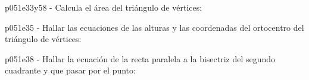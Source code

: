 \documentclass[spanish, 11pt]{exam}
\begin{document}
\begin{questions}
\begin{multicols}{1}
\begin{parts}
        \end{parts}
        \end{multicols}
        \question p051e33y58 - Calcula el área del triángulo de vértices:
        \begin{multicols}{1} 
        \end{multicols}
        \question p051e35 - Hallar las ecuaciones de las alturas y las coordenadas del ortocentro del triángulo de vértices:
        \begin{multicols}{1} 
        \end{multicols}
        \question p051e38 - Hallar la ecuación de la recta paralela a la bisectriz del segundo cuadrante y que pasar por el punto:
        \begin{multicols}{1} 
\end{multicols}
\end{questions}
\end{document}
